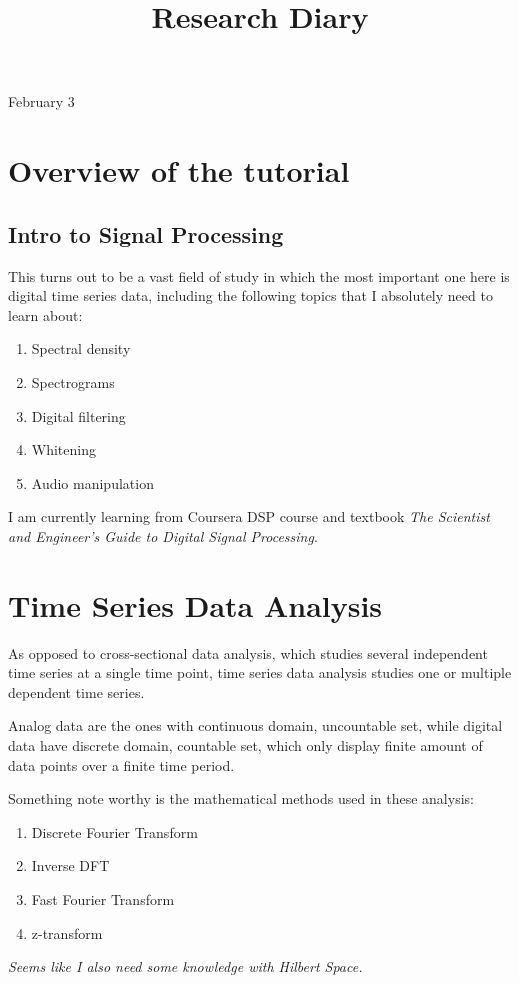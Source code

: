\documentclass[11pt,letterpaper]{article}
\begin{document}

\title{Research Diary}

{\Huge February 3}\\[5mm]

\section*{Overview of the tutorial}

\subsection*{Intro to Signal Processing}
This turns out to be a vast field of study in which the most important one here is digital time series data, including the following topics that I absolutely need to learn about:
\begin{enumerate}
    \item Spectral density
    \item Spectrograms
    \item Digital filtering
    \item Whitening
    \item Audio manipulation
\end{enumerate}

I am currently learning from Coursera DSP course and textbook \textit{The Scientist and Engineer's Guide to Digital Signal Processing}.

\section{Time Series Data Analysis}
As opposed to cross-sectional data analysis, which studies several independent time series at a single time point, time series data analysis studies one or multiple dependent time series. \par
Analog data are the ones with continuous domain, uncountable set, while digital data have discrete domain, countable set, which only display finite amount of data points over a finite time period. \par
Something note worthy is the mathematical methods used in these analysis:
\begin{enumerate}
    \item Discrete Fourier Transform
    \item Inverse DFT
    \item Fast Fourier Transform
    \item z-transform
\end{enumerate}

\textit{Seems like I also need some knowledge with Hilbert Space.}
\end{document}
